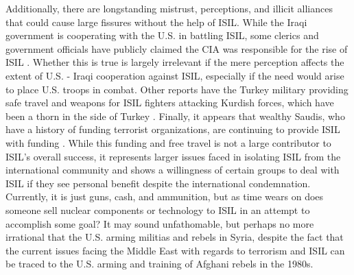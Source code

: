 \documentclass{report}
\begin{document}
Additionally, there are longstanding mistrust, perceptions, and illicit alliances that could cause large fissures  without the help of ISIL.  While the Iraqi government is cooperating with the U.S. in battling ISIL, some clerics and government officials have publicly claimed the CIA was responsible for the rise of ISIL \cite{Kirkpatrick2014}.  Whether this is true is largely irrelevant if the mere perception affects the extent of U.S. - Iraqi cooperation against ISIL, especially if the need would arise to place U.S. troops in combat.  Other reports have the Turkey military providing safe travel and weapons for ISIL fighters attacking Kurdish forces, which have been a thorn in the side of Turkey \cite{Guiton2014}.  Finally, it appears that wealthy Saudis, who have a history of funding terrorist organizations, are continuing to provide ISIL with funding \cite{Windrem2014}. While this funding and free travel is not a large contributor to ISIL's overall success, it represents larger issues faced in isolating ISIL from the international community and shows a willingness of certain groups to deal with ISIL if they see personal benefit despite the international condemnation.  Currently, it is just guns, cash, and ammunition, but as time wears on does someone sell nuclear components or technology to ISIL in an attempt to accomplish some goal?  It may sound unfathomable, but perhaps no more irrational that the U.S. arming militias and rebels in Syria, despite the fact that the current issues facing the Middle East with regards to terrorism and ISIL can be traced to the U.S. arming and training of Afghani rebels in the 1980s. 

\end{document}
